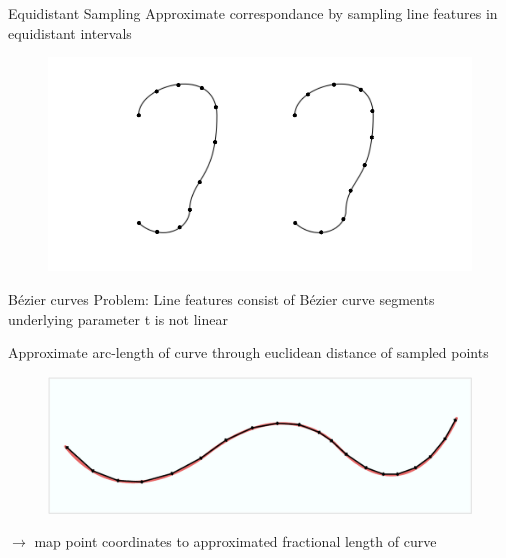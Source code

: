 \documentclass[xcolor=x11names,compress]{beamer}
\begin{document}
    \begin{frame}{Equidistant Sampling}
        Approximate correspondance by sampling line features in equidistant intervals
        \begin{figure}
            \centering
            \includegraphics[width=.7\textwidth]{../resources/figures/ears_diffparam.pdf}
        \end{figure}
    \end{frame}

    \begin{frame}{B\'{e}zier curves}
        Problem: Line features consist of B\'{e}zier curve segments\\
        underlying parameter t is not linear

        Approximate arc-length of curve through euclidean distance of sampled points
        \begin{figure}
            \centering
            \includegraphics[width=.7\textwidth]{../resources/figures/distance_computation.pdf}
        \end{figure}
        $\rightarrow$ map point coordinates to approximated fractional length of curve
    \end{frame}

\end{document}
